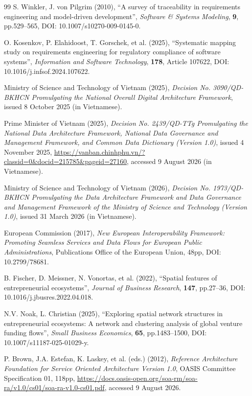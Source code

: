 \begin{thebibliography}{99}
S. Winkler, J. von Pilgrim (2010), ``A survey of traceability in requirements engineering and model-driven development'', \textit{Software \& Systems Modeling}, \textbf{9}, pp.529--565, DOI: 10.1007/s10270-009-0145-0.

O. Kosenkov, P. Elahidoost, T. Gorschek, et al. (2025), ``Systematic mapping study on requirements engineering for regulatory compliance of software systems'', \textit{Information and Software Technology}, \textbf{178}, Article 107622, DOI: 10.1016/j.infsof.2024.107622.

Ministry of Science and Technology of Vietnam (2025), \textit{Decision No. 3090/QD-BKHCN Promulgating the National Overall Digital Architecture Framework}, issued 8 October 2025 (in Vietnamese).

Prime Minister of Vietnam (2025), \textit{Decision No. 2439/QD-TTg Promulgating the National Data Architecture Framework, National Data Governance and Management Framework, and Common Data Dictionary (Version 1.0)}, issued 4 November 2025, \url{https://vanban.chinhphu.vn/?classid=0&docid=215785&pageid=27160}, accessed 9 August 2026 (in Vietnamese).

Ministry of Science and Technology of Vietnam (2026), \textit{Decision No. 1973/QD-BKHCN Promulgating the Data Architecture Framework and Data Governance and Management Framework of the Ministry of Science and Technology (Version 1.0)}, issued 31 March 2026 (in Vietnamese).

European Commission (2017), \textit{New European Interoperability Framework: Promoting Seamless Services and Data Flows for European Public Administrations}, Publications Office of the European Union, 48pp, DOI: 10.2799/78681.

B. Fischer, D. Meissner, N. Vonortas, et al. (2022), ``Spatial features of entrepreneurial ecosystems'', \textit{Journal of Business Research}, \textbf{147}, pp.27--36, DOI: 10.1016/j.jbusres.2022.04.018.

N.V. Noak, L. Christian (2025), ``Exploring spatial network structures in entrepreneurial ecosystems: A network and clustering analysis of global venture funding flows'', \textit{Small Business Economics}, \textbf{65}, pp.1483--1500, DOI: 10.1007/s11187-025-01029-y.

P. Brown, J.A. Estefan, K. Laskey, et al. (eds.) (2012), \textit{Reference Architecture Foundation for Service Oriented Architecture Version 1.0}, OASIS Committee Specification 01, 118pp, \url{https://docs.oasis-open.org/soa-rm/soa-ra/v1.0/cs01/soa-ra-v1.0-cs01.pdf}, accessed 9 August 2026.


\end{thebibliography}
